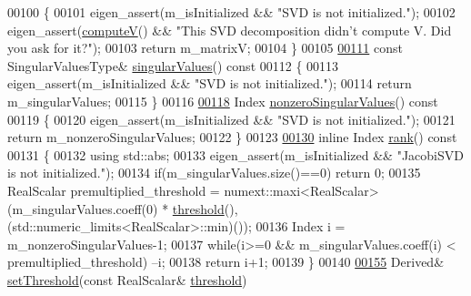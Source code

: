 \begin{DoxyCode}
00100 \textcolor{keyword}{  }\{
00101     eigen\_assert(m\_isInitialized && \textcolor{stringliteral}{"SVD is not initialized."});
00102     eigen\_assert(\hyperlink{group___s_v_d___module_a5f12efcb791eb007d4a4890ac5255ac4}{computeV}() && \textcolor{stringliteral}{"This SVD decomposition didn't compute V. Did you ask for it?"});
00103     \textcolor{keywordflow}{return} m\_matrixV;
00104   \}
00105 
\hyperlink{group___s_v_d___module_a4e7bac123570c348f7ed6be909e1e474}{00111}   \textcolor{keyword}{const} SingularValuesType& \hyperlink{group___s_v_d___module_a4e7bac123570c348f7ed6be909e1e474}{singularValues}()\textcolor{keyword}{ const}
00112 \textcolor{keyword}{  }\{
00113     eigen\_assert(m\_isInitialized && \textcolor{stringliteral}{"SVD is not initialized."});
00114     \textcolor{keywordflow}{return} m\_singularValues;
00115   \}
00116 
\hyperlink{group___s_v_d___module_afe8a555f38393a319a71ec0f0331c9ef}{00118}   Index \hyperlink{group___s_v_d___module_afe8a555f38393a319a71ec0f0331c9ef}{nonzeroSingularValues}()\textcolor{keyword}{ const}
00119 \textcolor{keyword}{  }\{
00120     eigen\_assert(m\_isInitialized && \textcolor{stringliteral}{"SVD is not initialized."});
00121     \textcolor{keywordflow}{return} m\_nonzeroSingularValues;
00122   \}
00123   
\hyperlink{group___s_v_d___module_a30b89e24f42f1692079eea31b361d26a}{00130}   \textcolor{keyword}{inline} Index \hyperlink{group___s_v_d___module_a30b89e24f42f1692079eea31b361d26a}{rank}()\textcolor{keyword}{ const}
00131 \textcolor{keyword}{  }\{
00132     \textcolor{keyword}{using} std::abs;
00133     eigen\_assert(m\_isInitialized && \textcolor{stringliteral}{"JacobiSVD is not initialized."});
00134     \textcolor{keywordflow}{if}(m\_singularValues.size()==0) \textcolor{keywordflow}{return} 0;
00135     RealScalar premultiplied\_threshold = numext::maxi<RealScalar>(m\_singularValues.coeff(0) * 
      \hyperlink{group___s_v_d___module_a98b2ee98690358951807353812a05c69}{threshold}(), (std::numeric\_limits<RealScalar>::min)());
00136     Index i = m\_nonzeroSingularValues-1;
00137     \textcolor{keywordflow}{while}(i>=0 && m\_singularValues.coeff(i) < premultiplied\_threshold) --i;
00138     \textcolor{keywordflow}{return} i+1;
00139   \}
00140   
\hyperlink{group___s_v_d___module_a1c95d05398fc15e410a28560ef70a5a6}{00155}   Derived& \hyperlink{group___s_v_d___module_a1c95d05398fc15e410a28560ef70a5a6}{setThreshold}(\textcolor{keyword}{const} RealScalar& \hyperlink{group___s_v_d___module_a98b2ee98690358951807353812a05c69}{threshold})

\end{DoxyCode}
